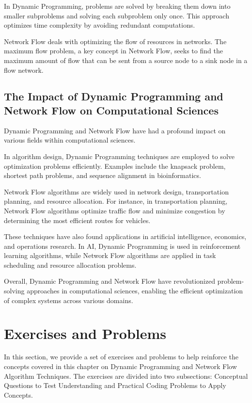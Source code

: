 \documentclass[12pt]{book} %
\begin{document}
In Dynamic Programming, problems are solved by breaking them down into smaller subproblems and solving each subproblem only once. This approach optimizes time complexity by avoiding redundant computations.

Network Flow deals with optimizing the flow of resources in networks. The maximum flow problem, a key concept in Network Flow, seeks to find the maximum amount of flow that can be sent from a source node to a sink node in a flow network.

\subsection{The Impact of Dynamic Programming and Network Flow on Computational Sciences}
Dynamic Programming and Network Flow have had a profound impact on various fields within computational sciences.

In algorithm design, Dynamic Programming techniques are employed to solve optimization problems efficiently. Examples include the knapsack problem, shortest path problems, and sequence alignment in bioinformatics.

Network Flow algorithms are widely used in network design, transportation planning, and resource allocation. For instance, in transportation planning, Network Flow algorithms optimize traffic flow and minimize congestion by determining the most efficient routes for vehicles.

These techniques have also found applications in artificial intelligence, economics, and operations research. In AI, Dynamic Programming is used in reinforcement learning algorithms, while Network Flow algorithms are applied in task scheduling and resource allocation problems.

Overall, Dynamic Programming and Network Flow have revolutionized problem-solving approaches in computational sciences, enabling the efficient optimization of complex systems across various domains.

\section{Exercises and Problems}
In this section, we provide a set of exercises and problems to help reinforce the concepts covered in this chapter on Dynamic Programming and Network Flow Algorithm Techniques. The exercises are divided into two subsections: Conceptual Questions to Test Understanding and Practical Coding Problems to Apply Concepts.
\end{document}

